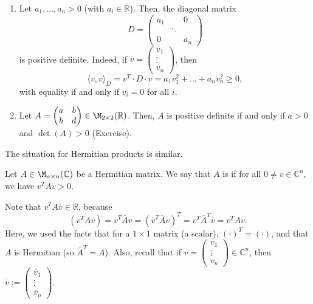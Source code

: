 \begin{example}
    \begin{enumerate}
        \item Let $a_1, \dots, a_n > 0$ (with $a_i \in \mathbb{R}$). Then, the diagonal matrix
        \begin{equation*}
            D = \begin{pmatrix} a_1 & & 0 \\ & \ddots & \\ 0 & & a_n \end{pmatrix}
        \end{equation*}
        is positive definite. Indeed, if $v = \begin{pmatrix} v_1 \\ \vdots \\ v_n \end{pmatrix}$, then
        \begin{equation*}
            \langle v, v \rangle_D = v^T \cdot D \cdot v = a_1 v_1^2 + \dots + a_n v_n^2 \geq 0,
        \end{equation*}
        with equality if and only if $v_i = 0$ for all $i$.
        \item Let $A = \begin{pmatrix} a & b \\ b & d \end{pmatrix} \in \M_{2 \times 2}(\mathbb{R})$. Then, $A$ is positive definite if and only if $a > 0$ and $\det(A) > 0$ (Exercise).
    \end{enumerate}
\end{example}

The situation for Hermitian products is similar.

\begin{definition}
    Let $A \in \M_{n \times n}(\mathbb{C})$ be a Hermitian matrix. We say that $A$ is  if for all $0 \neq v \in \mathbb{C}^n$, we have $v^T A \overline{v} > 0$. 
\end{definition}

\begin{remark}
    Note that $v^T A \overline{v} \in \mathbb{R}$, because
    \begin{equation*}
        \overline{(v^T A \overline{v})} = \overline{v}^T \overline{A} v = (\overline{v}^T \overline{A} v)^T = v^T \overline{A}^T \overline{v} = v^T A \overline{v}.
    \end{equation*}
    Here, we used the facts that for a $1 \times 1$ matrix (a scalar), $(\cdot)^T = (\cdot)$, and that $A$ is Hermitian (so $\overline{A}^T = A$). Also, recall that if $v = \begin{pmatrix} v_1 \\ \vdots \\ v_n \end{pmatrix} \in \mathbb{C}^n$, then $\overline{v} := \begin{pmatrix} \overline{v}_1 \\ \vdots \\ \overline{v}_n \end{pmatrix}$.
\end{remark}

